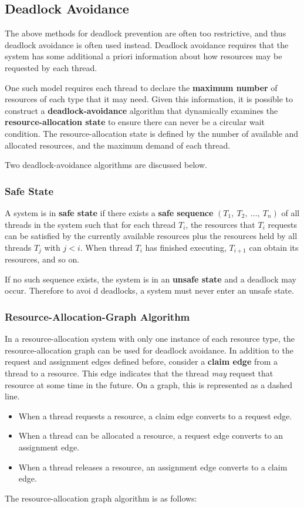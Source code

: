 \documentclass{article}
\begin{document}
\subsection{Deadlock Avoidance}
The above methods for deadlock prevention are often too restrictive,
and thus deadlock avoidance is often used instead. Deadlock avoidance
requires that the system has some additional a priori information about
how resources may be requested by each thread.

One such model requires each thread to declare the \textbf{maximum
number} of resources of each type that it may need. Given this
information, it is possible to construct a \textbf{deadlock-avoidance}
algorithm that dynamically examines the \textbf{resource-allocation
state} to ensure there can never be a circular wait condition. The
resource-allocation state is defined by the number of available and
allocated resources, and the maximum demand of each thread.

Two deadlock-avoidance algorithms are discussed below.
\subsubsection{Safe State}
A system is in \textbf{safe state} if there exists a \textbf{safe
sequence} \(\left( T_1,\: T_2,\: \ldots,\: T_n \right)\) of all threads
in the system such that for each thread \(T_i\), the resources that
\(T_i\) requests can be satisfied by the currently available resources
plus the resources held by all threads \(T_j\) with \(j < i\). When
thread \(T_i\) has finished executing, \(T_{i+1}\) can obtain its
resources, and so on.

If no such sequence exists, the system is in an \textbf{unsafe state}
and a deadlock may occur. Therefore to avoi d deadlocks, a system must
never enter an unsafe state.
\subsubsection{Resource-Allocation-Graph Algorithm}
In a resource-allocation system with only one instance of each resource
type, the resource-allocation graph can be used for deadlock avoidance.
In addition to the request and assignment edges defined before,
consider a \textbf{claim edge} from a thread to a resource. This edge
indicates that the thread \textit{may} request that resource at some
time in the future. On a graph, this is represented as a dashed line.
\begin{itemize}
    \item When a thread requests a resource, a claim edge converts to a
          request edge.
    \item When a thread can be allocated a resource, a request edge
          converts to an assignment edge.
    \item When a thread releases a resource, an assignment edge
          converts to a claim edge.
\end{itemize}
The resource-allocation graph algorithm is as follows:
\end{document}
